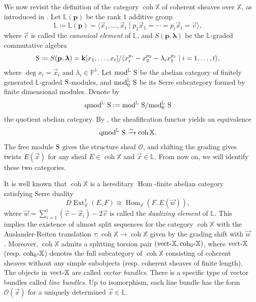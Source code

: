 \documentclass[11pt,a4paper,reqno]{amsart}%
\theoremstyle{plain}
\theoremstyle{definition}
\numberwithin{equation}{section}
\numberwithin{equation}{section}
\def\<{\langle}
\def\>{\rangle}
\def\XX{\mathbb{X}}
\newcommand{\vc}{\vec{c}}
\newcommand{\vn}{\vec{w}}  %
\newcommand{\vx}{\vec{x}}
\newcommand{\Hom}{\operatorname{Hom}\nolimits}
\newcommand{\Ext}{\operatorname{Ext}\nolimits}
\def\coh{\operatorname{coh}}
\def\Hom{\operatorname{Hom}}
\def\Ext{\operatorname{Ext}}
\newcommand{\cO}{\mathcal{O}}
\def\coh{\operatorname{coh}}
\begin{document}
We now revisit  the definition of the category $\coh\XX$ of coherent sheaves over $\mathbb{X}$,  as   introduced in  \cite[Section 1]{GL87}. 
Let $\mathbb{L}(\mathbf{p})$ be the rank 1 additive group
\[
\mathbb{L}\coloneqq\mathbb{L}(\mathbf{p})= \<\vx_1,\ldots,\vx_t\mid p_1\vx_1=\cdots=p_t\vx_t=\vc\>,
\] where $\vc$ is called the \emph{canonical element} of $\mathbb{L}$,
and $S(\mathbf{p},\boldsymbol{\lambda})$ be the $\mathbb{L}$-graded commutative algebra
\[
{\rm S}\coloneqq S(\mathbf{p},\boldsymbol{\lambda}) = \mathbf{k}[x_1,\ldots,x_t]/
\<x_i^{p_i}-x_2^{p_2}-\lambda_i x_1^{p_1}\mid i=1,\ldots,t\>, 
\]
where $\deg x_i=\vx_i$ and $\lambda_i \in\mathbb{P}^1$.
   Let ${\rm mod}^{\mathbb{L}}\ {\rm S}$ be the abelian category of finitely generated $\mathbb{L}$-graded ${\rm S}$-modules, and 
${\rm mod}_0^{\mathbb{L}}\ {\rm S}$ be its Serre subcategory formed by finite dimensional modules. Denote by $${\rm qmod}^{\mathbb{L}}\ {\rm S}:={\rm mod}^{\mathbb{L}}\ {\rm S}/{\rm mod}_0^{\mathbb{L}}\ {\rm S}$$ the quotient abelian category. By \cite[Theorem 1.8]{GL87}, the sheafification functor yields an equivalence
\[
{\rm qmod}^{\mathbb{L}}\ {\rm S}\xrightarrow{\sim} \coh\XX.
\] The free module ${\rm S}$ gives the structure
sheaf $\cO$, and shifting the grading gives twists $E(\vx)$ for any sheaf
$E\in\coh\XX$ and $\vx\in \mathbb{L}$. 
From now on, we will identify these two categories.  

It is well known that $\coh\XX$ is a hereditary  $\Hom$-finite abelian category  satisfying
Serre duality
\[
D\Ext^1_\XX(E,F)\cong\Hom_\XX(F,E(\vn)),
\]
 where $\vn = \sum_{i=1}^t(\vc-\vx_i)-2\vc$ is called the \emph{dualizing element} of $\mathbb{L}$. This  implies the existence of almost split sequences for the category $\coh\XX$  with the Auslander-Reiten translation $\tau:\coh\XX\to\coh\XX$ given by the grading shift with $\vn$. 
 Moreover, 
$\coh\XX$ admits a splitting torsion pair $({\rm vect}\mbox{-}\mathbb{X}, {\rm coh}_{0}\mbox{-}\mathbb{X})$, 
where ${\rm vect}\mbox{-}\mathbb{X}$ (resp.  ${\rm coh}_{0}\mbox{-}\mathbb{X}$) denotes the full subcategory of $\coh\XX$ consisting of coherent sheaves without any simple subobjects (resp. coherent sheaves of finite length).
The objects in ${\rm vect}\mbox{-}\mathbb{X}$ are called \emph{vector bundles}.  
There is a specific type of vector bundles  called \emph{line bundles}. Up to isomorphism, each line bundle has the form $\cO(\vec{x})$ for a uniquely determined $\vec{x}\in\mathbb{L}$.    
\end{document}
